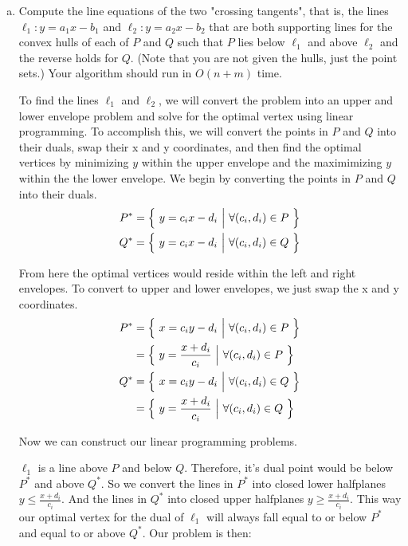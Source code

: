 \documentclass[11pt]{article}
\begin{document}
\begin{enumerate}[(a)]\itemsep0pt
  \item
    Compute the line equations of the two "crossing tangents", that is, the lines
    \(\ell_1: y = a_1 x - b_1\) and \(\ell_2: y = a_2 x - b_2\) that are both supporting lines for the convex
    hulls of each of \(P\) and \(Q\) such that \(P\) lies below \(\ell_1\) and above \(\ell_2\) and the reverse holds
    for \(Q\). (Note that you are not given the hulls, just the point sets.) Your algorithm
    should run in \(O(n + m)\) time.
    
\begin{solution}
  To find the lines \(\ell_1\) and \(\ell_2\), we will convert the problem into an upper and lower envelope problem and solve for the optimal vertex using linear programming.
  To accomplish this, we will convert the points in \(P\) and \(Q\) into their duals, swap their x and y coordinates, and then find the optimal vertices by minimizing \(y\) within the
  upper envelope and the maximimizing \(y\) within the the lower envelope.
  We begin by converting the points in \(P\) and \(Q\) into their duals.
  \begin{align*}
    P^* = \Bigl\{ \ y = c_i x - d_i \ \Big| \ \forall (c_i, d_i) \in P \ \Bigl\} \\
    Q^* = \Bigl\{ \ y = c_i x - d_i \ \Big| \ \forall (c_i, d_i) \in Q \ \Bigl\}
  \end{align*}

  From here the optimal vertices would reside within the left and right envelopes. To convert to upper and lower envelopes, we just swap the x and y coordinates.
  \begin{align*}
    P^* &= \Bigl\{ \ x = c_i y - d_i \ \Big| \ \forall (c_i, d_i) \in P \ \Bigl\} \\
    &= \Bigl\{ \ y = \frac{x + d_i}{c_i} \ \Big| \ \forall (c_i, d_i) \in P \ \Bigl\} \\
    Q^* &= \Bigl\{ \ x = c_i y - d_i \ \Big| \ \forall (c_i, d_i) \in Q \ \Bigl\} \\
    &= \Bigl\{ \ y = \frac{x + d_i}{c_i} \ \Big| \ \forall (c_i, d_i) \in Q \ \Bigl\}
  \end{align*}

  Now we can construct our linear programming problems.

  \(\ell_1\) is a line above \(P\) and below \(Q\). Therefore, it's dual point would be below \(P^*\) and above \(Q^*\). So we convert the lines in \(P^*\) into closed lower halfplanes
  \(y \leq \frac{x + d_i}{c_i}\). And the lines in \(Q^*\) into closed upper halfplanes \(y \geq \frac{x + d_i}{c_i}\). This way our optimal vertex for the dual of \(\ell_1\) will
  always fall equal to or below \(P^*\) and equal to or above \(Q^*\). Our problem is then:


\end{solution}
\end{enumerate}
\end{document}

